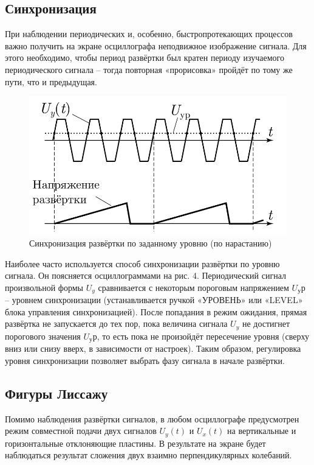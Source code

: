 \documentclass[a4paper, 12pt]{article}
\begin{document}
\subsection{Синхронизация}
При наблюдении периодических и, особенно, быстропротекающих процессов важно получить на экране осциллографа неподвижное изображение сигнала. Для этого необходимо, чтобы
период развёртки был кратен периоду изучаемого периодического сигнала -- тогда повторная «прорисовка» пройдёт по тому же пути, что и предыдущая.

\begin{figure}[h]
    \centering
    \includegraphics{uyux.png}
    \caption{Синхронизация развёртки по заданному уровню (по нарастанию)}
    \label{fig:uyux}
\end{figure}

Наиболее часто используется способ синхронизации развёртки по
уровню сигнала. Он поясняется осциллограммами на рис. 4. Периодический сигнал произвольной формы $U_y$ сравнивается с некоторым пороговым напряжением $U_ур$ -- уровнем синхронизации (устанавливается ручкой «УРОВЕНЬ» или «LEVEL» блока управления синхронизацией). После попадания в режим ожидания, прямая развёртка не запускается до тех пор, пока величина сигнала $U_y$ не достигнет порогового значения $U_ур$, то есть пока не произойдёт пересечение уровня (сверху вниз или снизу вверх, в зависимости от настроек). Таким образом, регулировка уровня синхронизации позволяет выбрать фазу сигнала в начале развёртки.

\subsection{Фигуры Лиссажу}
Помимо наблюдения развёртки сигналов, в любом осциллографе предусмотрен режим совместной подачи двух сигналов $U_y(t)$ и $U_x(t)$ на вертикальные и горизонтальные отклоняющие пластины. В результате на экране будет наблюдаться результат сложения двух взаимно перпендикулярных колебаний.
\end{document}
